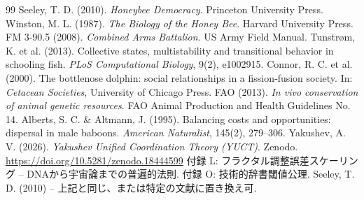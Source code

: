 \documentclass[12pt]{article}
\theoremstyle{remark}
\begin{document}
	\begin{thebibliography}{99}
		 Seeley, T. D. (2010). \emph{Honeybee Democracy}. Princeton University Press.
		 Winston, M. L. (1987). \emph{The Biology of the Honey Bee}. Harvard University Press.
		 FM 3-90.5 (2008). \emph{Combined Arms Battalion}. US Army Field Manual.
		 Tunstrøm, K. et al. (2013). Collective states, multistability and transitional behavior in schooling fish. \emph{PLoS Computational Biology}, 9(2), e1002915.
		 Connor, R. C. et al. (2000). The bottlenose dolphin: social relationships in a fission‑fusion society. In: \emph{Cetacean Societies}, University of Chicago Press.
		 FAO (2013). \emph{In vivo conservation of animal genetic resources}. FAO Animal Production and Health Guidelines No. 14.
		 Alberts, S. C. \& Altmann, J. (1995). Balancing costs and opportunities: dispersal in male baboons. \emph{American Naturalist}, 145(2), 279–306.
		 Yakushev, A. V. (2026). \emph{Yakushev Unified Coordination Theory (YUCT)}. Zenodo. \url{https://doi.org/10.5281/zenodo.18444599}
		 付録 L: フラクタル調整誤差スケーリング – DNAから宇宙論までの普遍的法則.
		 付録 O: 技術的辞書閾値公理.
		 Seeley, T. D. (2010) – 上記と同じ、または特定の文献に置き換え可.
	\end{thebibliography}
	
\end{document}
